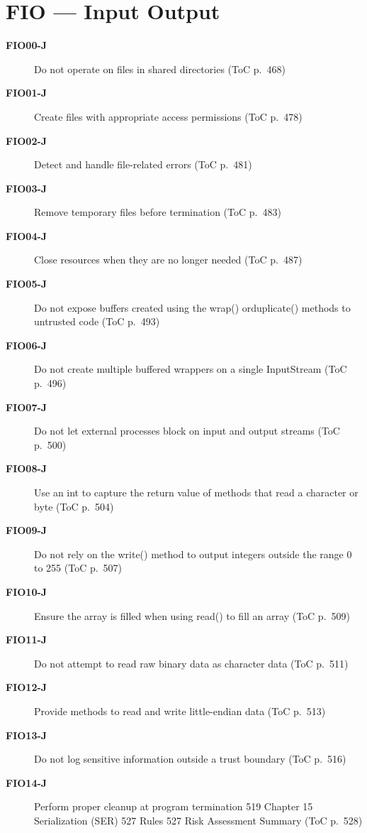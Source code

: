 \documentclass[11pt]{report}
\begin{document}
\chapter{FIO — Input Output}
\begin{description}
\item[\textbf{FIO00-J}] Do not operate on files in shared directories (ToC p.~468)
\item[\textbf{FIO01-J}] Create files with appropriate access permissions (ToC p.~478)
\item[\textbf{FIO02-J}] Detect and handle file-related errors (ToC p.~481)
\item[\textbf{FIO03-J}] Remove temporary files before termination (ToC p.~483)
\item[\textbf{FIO04-J}] Close resources when they are no longer needed (ToC p.~487)
\item[\textbf{FIO05-J}] Do not expose buffers created using the wrap() orduplicate() methods to untrusted code (ToC p.~493)
\item[\textbf{FIO06-J}] Do not create multiple buffered wrappers on a single InputStream (ToC p.~496)
\item[\textbf{FIO07-J}] Do not let external processes block on input and output streams (ToC p.~500)
\item[\textbf{FIO08-J}] Use an int to capture the return value of methods that read a character or byte (ToC p.~504)
\item[\textbf{FIO09-J}] Do not rely on the write() method to output integers outside the range 0 to 255 (ToC p.~507)
\item[\textbf{FIO10-J}] Ensure the array is filled when using read() to fill an array (ToC p.~509)
\item[\textbf{FIO11-J}] Do not attempt to read raw binary data as character data (ToC p.~511)
\item[\textbf{FIO12-J}] Provide methods to read and write little-endian data (ToC p.~513)
\item[\textbf{FIO13-J}] Do not log sensitive information outside a trust boundary (ToC p.~516)
\item[\textbf{FIO14-J}] Perform proper cleanup at program termination 519 Chapter 15 Serialization (SER) 527 Rules 527 Risk Assessment Summary (ToC p.~528)
\end{description}
\clearpage
\end{document}
